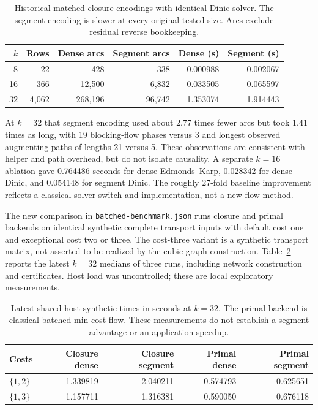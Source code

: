 \documentclass[11pt]{article}
\theoremstyle{remark}
\begin{document}
\begin{table}[ht]
\centering\small
\begin{tabular}{r r r r r r}
\toprule
$k$&Rows&Dense arcs&Segment arcs&Dense (s)&Segment (s)\\
\midrule
8&22&428&338&0.000988&0.002067\\
16&366&12,500&6,832&0.033505&0.065597\\
32&4,062&268,196&96,742&1.353074&1.914443\\
\bottomrule
\end{tabular}
\caption{Historical matched closure encodings with identical Dinic solver. The segment encoding is slower at every original tested size. Arcs exclude residual reverse bookkeeping.}
\label{tab:bench}
\end{table}

At $k=32$ that segment encoding used about $2.77$ times fewer arcs but took $1.41$ times as long, with 19 blocking-flow phases versus 3 and longest observed augmenting paths of lengths 21 versus 5. These observations are consistent with helper and path overhead, but do not isolate causality. A separate $k=16$ ablation gave 0.764486 seconds for dense Edmonds--Karp, 0.028342 for dense Dinic, and 0.054148 for segment Dinic. The roughly $27$-fold baseline improvement reflects a classical solver switch and implementation, not a new flow method.

The new comparison in \texttt{batched-benchmark.json} runs closure and primal backends on identical synthetic complete transport inputs with default cost one and exceptional cost two or three. The cost-three variant is a synthetic transport matrix, not asserted to be realized by the cubic graph construction. Table~\ref{tab:primal} reports the latest $k=32$ medians of three runs, including network construction and certificates. Host load was uncontrolled; these are local exploratory measurements.

\begin{table}[ht]
\centering\small
\begin{tabular}{l r r r r}
\toprule
Costs&Closure dense&Closure segment&Primal dense&Primal segment\\
\midrule
$\{1,2\}$&1.339819&2.040211&0.574793&0.625651\\
$\{1,3\}$&1.157711&1.316381&0.590050&0.676118\\
\bottomrule
\end{tabular}
\caption{Latest shared-host synthetic times in seconds at $k=32$. The primal backend is classical batched min-cost flow. These measurements do not establish a segment advantage or an application speedup.}
\label{tab:primal}
\end{table}
\end{document}
